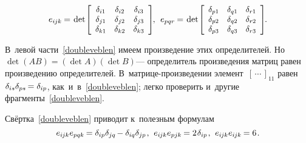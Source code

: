 \begin{otherlanguage}{russian}
\nopagebreak\vspace{-0.4em}\begin{equation*}
e_{i\hspace{-0.1ex}jk} \hspace{-0.1ex} = \hspace{.2ex}
\operatorname{det}\hspace{-0.25ex} \scalebox{0.96}[0.96]{$\left[\begin{array}{ccc}
\delta_{i1} & \delta_{i2} & \delta_{i3} \\
\delta_{j1} & \delta_{j2} & \delta_{j3} \\
\delta_{k1} & \delta_{k2} & \delta_{k3}
\end{array}\right]$} \hspace{-0.25ex}, \:\:
e_{pqr} \hspace{-0.1ex} = \hspace{.2ex}
\operatorname{det}\hspace{-0.25ex} \scalebox{0.96}[0.96]{$\left[\begin{array}{ccc}
\delta_{p1} & \delta_{q1} & \delta_{r1} \\
\delta_{p2} & \delta_{q2} & \delta_{r2} \\
\delta_{p3} & \delta_{q3} & \delta_{r3}
\end{array}\right]$}
\hspace{-0.25ex} .
\end{equation*}

\vspace{-0.1em} \noindent В~левой части~\eqref{doubleveblen} имеем произведение этих определителей. Но~${\operatorname{det} (AB) = (\operatorname{det} A)(\operatorname{det} B)}$\:--- определитель произведения матриц равен произведению определителей. В~матрице\hbox{-}произведении элемент~${\left[{\,\cdots\,}\right]}_{11}$ равен~${\delta_{is} \delta_{ps} \hspace{-0.2ex} = \delta_{ip}}$, как~и~в~\eqref{doubleveblen}; легко проверить и~другие фрагменты~\eqref{doubleveblen}.

Свёртка~\eqref{doubleveblen} приводит к~полезным формулам
\begin{equation}\label{veblencontraction}
e_{i\hspace{-0.1ex}jk} e_{pqk} \hspace{-0.16ex} = \delta_{ip} \delta_{jq} \hspace{-0.2ex} - \delta_{iq} \delta_{jp} \hspace{.2ex}, \:\,
e_{i\hspace{-0.1ex}jk} e_{pjk} \hspace{-0.16ex} = 2 \hspace{.16ex} \delta_{ip} \hspace{.2ex}, \:\,
e_{i\hspace{-0.1ex}jk} e_{i\hspace{-0.1ex}jk} \hspace{-0.16ex} = 6 \hspace{.2ex}.
\end{equation}


\end{otherlanguage}
